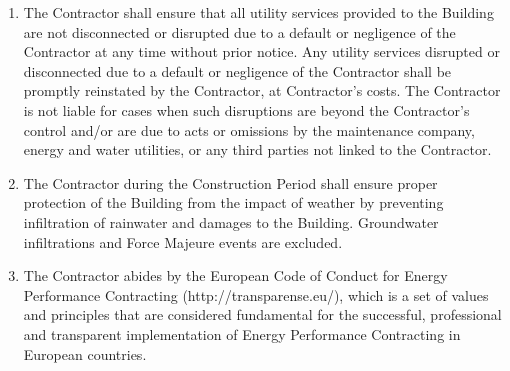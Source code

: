 \begin{multicols}{2}
\begin{enumerate}
	\item	The Contractor shall ensure that all utility services provided to the Building are not disconnected or disrupted due to a default or negligence of the Contractor at any time without prior notice. Any utility services disrupted or disconnected due to a default or negligence of the Contractor shall be promptly reinstated by the Contractor, at Contractor’s costs. The Contractor is not liable for cases when such disruptions are beyond the Contractor’s control and/or are due to acts or omissions by the maintenance company, energy and water utilities, or any third parties not linked to the Contractor.
	\item	The Contractor during the Construction Period shall ensure proper protection of the Building from the impact of weather by preventing infiltration of rainwater and damages to the Building. Groundwater infiltrations and Force Majeure events are excluded.
	\item	The Contractor abides by the European Code of Conduct for Energy Performance Contracting (http://transparense.eu/), which is a set of values and principles that are considered fundamental for the successful, professional and transparent implementation of Energy Performance Contracting in European countries.
\end{enumerate}


\end{multicols}
